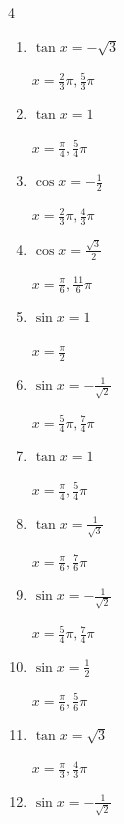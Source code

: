 \begin{multicols}{4}
\begin{enumerate}
  \item $\displaystyle \tan{x}  = -\sqrt{3}$

        $\displaystyle x = \frac{2}{3}\pi , \frac{5}{3}\pi$

  \item $\displaystyle \tan{x}  = 1$

        $\displaystyle x = \frac{\pi}{4} , \frac{5}{4}\pi$

  \item $\displaystyle \cos{x}  = -\frac{1}{2}$

        $\displaystyle x = \frac{2}{3}\pi , \frac{4}{3}\pi$

  \item $\displaystyle \cos{x}  = \frac{\sqrt{3}}{2}$

        $\displaystyle x = \frac{\pi}{6} , \frac{11}{6}\pi$

  \item $\displaystyle \sin{x}  = 1$

        $\displaystyle x = \frac{\pi}{2}$

  \item $\displaystyle \sin{x}  = -\frac{1}{\sqrt{2}}$

        $\displaystyle x = \frac{5}{4}\pi , \frac{7}{4}\pi$

  \item $\displaystyle \tan{x}  = 1$

        $\displaystyle x = \frac{\pi}{4} , \frac{5}{4}\pi$

  \item $\displaystyle \tan{x}  = \frac{1}{\sqrt{3}}$

        $\displaystyle x = \frac{\pi}{6} , \frac{7}{6}\pi$

  \item $\displaystyle \sin{x}  = -\frac{1}{\sqrt{2}}$

        $\displaystyle x = \frac{5}{4}\pi , \frac{7}{4}\pi$

  \item $\displaystyle \sin{x}  = \frac{1}{2}$

        $\displaystyle x = \frac{\pi}{6} , \frac{5}{6}\pi$

\columnbreak %

  \item $\displaystyle \tan{x}  = \sqrt{3}$

        $\displaystyle x = \frac{\pi}{3} , \frac{4}{3}\pi$

  \item $\displaystyle \sin{x}  = -\frac{1}{\sqrt{2}}$


\end{enumerate}
\end{multicols}
